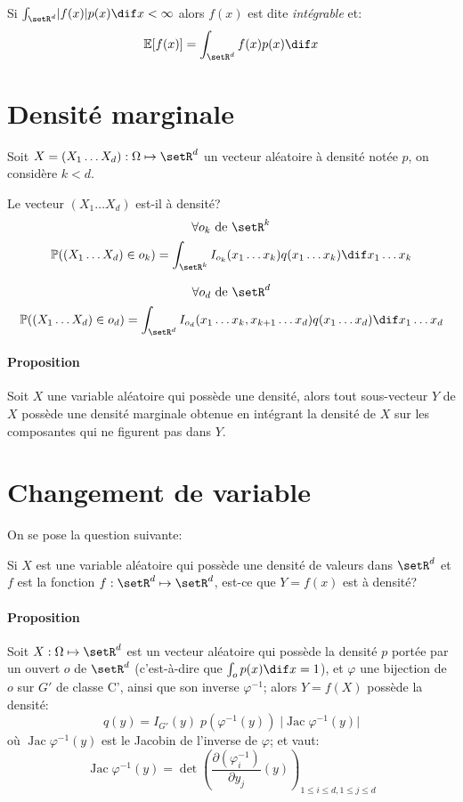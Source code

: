 \documentclass[a4paper,10pt,french,openany]{memoir}
\newcommand{\Proba}{\mathbb{P}}
\newcommand{\Esper}{\mathbb{E}}
\newcommand{\xoned}{x_1\dots x_d}
\newcommand{\Xoned}{X_1\dots X_d}
\newcommand{\xonek}{x_1\dots x_k}
\DeclareMathOperator{\jac}{Jac}
\begin{document}
Si $\int_{\setR^d} \lvert f(x) \rvert p(x) \dif x < \infty$ alors $f(x)$ est dite \emph{intégrable} et:
\[ \Esper[f(x)] = \int_{\setR^d} f(x) p(x) \dif x \]

\section{Densité marginale}
Soit $X=(\Xoned):\Omega \mapsto \setR^d$ un vecteur aléatoire à densité notée $p$, on considère $k<d$.

Le vecteur $(\Xoned)$ est-il à densité?
\[\forall o_k \text{ de }\setR^k\]
\[ \Proba((\Xoned) \in o_k) = \int_{\setR^k} I_{o_k}(\xonek) q(\xonek) \dif \xonek\]

\[\forall o_d \text{ de }\setR^d\]
\[\Proba((\Xoned) \in o_d) = \int_{\setR^d} I_{o_d}(x_1\dots x_k, x_{k+1}\dots x_d) q(\xoned) \dif \xoned\]

\paragraph{Proposition}
Soit $X$ une variable aléatoire qui possède une densité, alors tout sous-vecteur $Y$ de $X$ possède une densité marginale obtenue en intégrant la densité de $X$ sur les composantes qui ne figurent pas dans $Y$.

\section{Changement de variable}
On se pose la question suivante:
\begin{cquote}{}
 Si $X$ est une variable aléatoire qui possède une densité de valeurs dans $\setR^d$ et $f$ est la fonction $f:\setR^d \mapsto \setR^d$, est-ce que $Y=f(x)$ est à densité?
\end{cquote}

\paragraph{Proposition}
Soit $X:\Omega \mapsto \setR^d$ est un vecteur aléatoire qui possède la densité $p$ portée par un ouvert $o$ de $\setR^d$ (c'est-à-dire que $\int_o p(x) \dif x = 1$), et $\varphi$ une bijection de $o$ sur $G'$ de classe C', ainsi que son inverse $\varphi^{-1}$; alors $Y=f(X)$ possède la densité:
\[q(y) = I_{G'}(y)\;p(\varphi^{-1}(y)) \; \lvert \jac \varphi^{-1}(y) \rvert \]
où $\jac\varphi^{-1} (y)$ est le Jacobin de l'inverse de $\varphi$; et vaut:
\[ \jac \varphi^{-1}(y) = \det\left(\frac{\partial(\varphi^{-1}_i)}{\partial y_j}(y)\right)_{1\leq i\leq d, 1\leq j \leq d} \]
\end{document}

